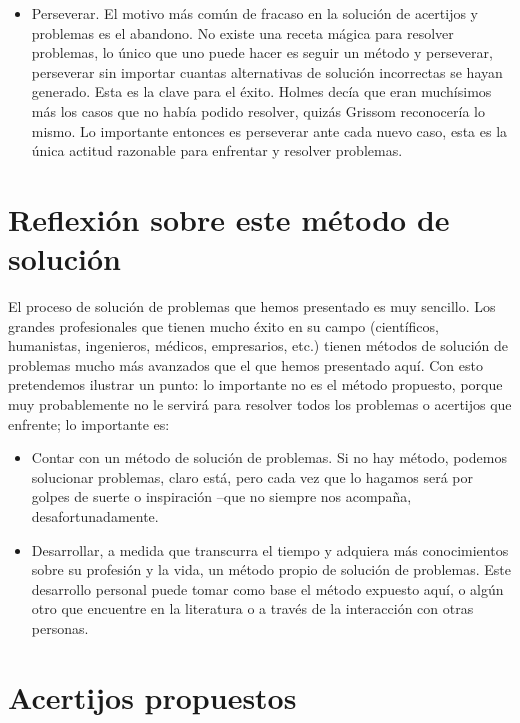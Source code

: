 \begin{itemize}
	\item Perseverar. El motivo más común de fracaso en la solución de 
	acertijos y problemas es el abandono. No existe una receta mágica para 
	resolver problemas, lo único que uno puede hacer es seguir un método y 
	perseverar, perseverar sin importar cuantas alternativas de solución 
	incorrectas se hayan generado.
	Esta es la clave para el éxito. Holmes decía que eran muchísimos más los 
	casos que no había podido resolver, quizás Grissom reconocería lo mismo. Lo 
	importante entonces es perseverar ante cada nuevo caso, esta es la única 
	actitud razonable para enfrentar y resolver problemas.
\end{itemize}

\section{Reflexión sobre este método de solución}

El proceso de solución de problemas que hemos presentado es muy sencillo. Los 
grandes profesionales que tienen mucho éxito en su campo (científicos, 
humanistas, ingenieros, médicos, empresarios, etc.) tienen métodos de solución 
de problemas mucho más avanzados que el que hemos presentado aquí. Con esto 
pretendemos ilustrar un punto: lo importante no es el método propuesto, porque 
muy probablemente no le servirá para resolver todos los problemas o acertijos 
que enfrente; lo importante es:

\begin{itemize}
	\item Contar con un método de solución de problemas. Si no hay método, 
	podemos solucionar problemas, claro está, pero cada vez que lo hagamos será 
	por golpes de suerte o inspiración --que no siempre nos acompaña, 
	desafortunadamente. 
	
	\item Desarrollar, a medida que transcurra el tiempo y adquiera más 
	conocimientos sobre su profesión y la vida, un método propio de solución de 
	problemas. Este desarrollo personal puede tomar como base el método 
	expuesto aquí, o algún otro que encuentre en la literatura o a través de la 
	interacción con otras personas.
\end{itemize}


\section{Acertijos propuestos}

